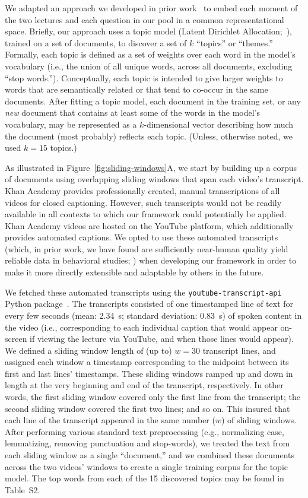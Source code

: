 \documentclass[10pt]{article}
\newcommand{\topics}{S2}
\begin{document}
We adapted an approach we developed in prior work~\citep{HeusEtal21} to embed
each moment of the two lectures and each question in our pool in a common
representational space. Briefly, our approach uses a topic model (Latent
Dirichlet Allocation;~\citealp{BleiEtal03}), trained on a set of documents, to
discover a set of $k$ ``topics'' or ``themes.'' Formally, each topic is defined
as a set of weights over each word in the model's vocabulary (i.e., the union
of all unique words, across all documents, excluding ``stop words.'').
Conceptually, each topic is intended to give larger weights to words that are
semantically related or that tend to co-occur in the same documents. After
fitting a topic model, each document in the training set, or any \textit{new}
document that contains at least some of the words in the model's vocabulary,
may be represented as a $k$-dimensional vector describing how much the document
(most probably) reflects each topic. (Unless, otherwise noted, we used $k = 15$
topics.)

As illustrated in Figure~\ref{fig:sliding-windows}A, we start by building up a
corpus of documents using overlapping sliding windows that span each video's
transcript. Khan Academy provides professionally created, manual transcriptions
of all videos for closed captioning. However, such transcripts would not be
readily available in all contexts to which our framework could potentially be
applied. Khan Academy videos are hosted on the YouTube platform, which
additionally provides automated captions. We opted to use these automated
transcripts (which, in prior work, we have found are sufficiently near-human
quality yield reliable data in behavioral studies; \citealp{ZimaEtal18}) when
developing our framework in order to make it more directly extensible and
adaptable by others in the future.

We fetched these automated transcripts using the
\texttt{youtube-transcript-api} Python package~\citep{Depo19}. The transcripts
consisted of one timestamped line of text for every few seconds (mean: 2.34~s;
standard deviation: 0.83~s) of spoken content in the video (i.e., corresponding
to each individual caption that would appear on-screen if viewing the lecture
via YouTube, and when those lines would appear). We defined a sliding window
length of (up to) $w = 30$ transcript lines, and assigned each window a
timestamp corresponding to the midpoint between its first and last lines'
timestamps. These sliding windows ramped up and down in length at the very
beginning and end of the transcript, respectively. In other words, the first
sliding window covered only the first line from the transcript; the second
sliding window covered the first two lines; and so on. This insured that each
line of the transcript appeared in the same number ($w$) of sliding windows.
After performing various standard text preprocessing (e.g., normalizing case,
lemmatizing, removing punctuation and stop-words), we treated the text from
each sliding window as a single ``document,'' and we combined these documents
across the two videos' windows to create a single training corpus for the topic
model. The top words from each of the 15 discovered topics may be found in
Table~\topics.
\end{document}
